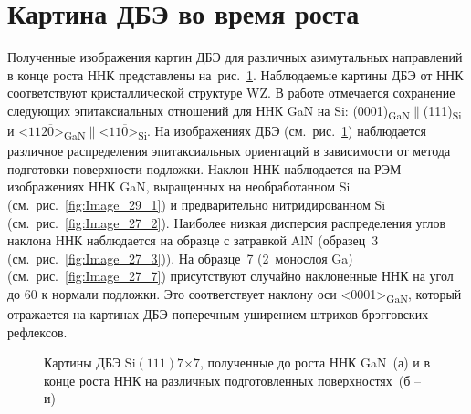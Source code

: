 \section{Картина ДБЭ во время роста}\label{sec:ch4/sec3}

Полученные изображения картин ДБЭ для различных азимутальных направлений в конце роста ННК представлены на~рис.~\cref{fig:Image_29}. Наблюдаемые картины ДБЭ от ННК соответствуют кристаллической структуре WZ. В работе \cite{Wierzbicka2013} отмечается сохранение следующих эпитаксиальных отношений для ННК GaN на Si: (0001)\textsubscript{GaN}\(\parallel\)(111)\textsubscript{Si} и <\(112\overline{0}\)>\textsubscript{GaN}\(\parallel\)<\(11\overline{0}\)>\textsubscript{Si}. На изображениях ДБЭ (см.~рис.~\cref{fig:Image_29}) наблюдается различное распределения эпитаксиальных ориентаций в зависимости от метода подготовки поверхности подложки. Наклон ННК наблюдается на РЭМ изображениях ННК GaN, выращенных на необработанном Si (см.~рис.~\cref{fig:Image_29_1}) и предварительно нитридированном Si (см.~рис.~\cref{fig:Image_27_2}). Наиболее низкая дисперсия распределения углов наклона ННК наблюдается на образце с затравкой AlN (образец~3 (см.~рис.~\cref{fig:Image_27_3})). На образце~7 (2~монослоя Ga) (см.~рис.~\cref{fig:Image_27_7}) присутствуют случайно наклоненные ННК на угол до 60{\textdegree} к нормали подложки. Это соответствует наклону оси <0001>\textsubscript{GaN}, который отражается на картинах ДБЭ поперечным уширением штрихов брэгговских рефлексов.

\begin{figure}[ht]
	\caption{Картины ДБЭ Si\((111)7\)\(\times\)\(7\), полученные до роста ННК GaN~(а) и в конце роста ННК на различных подготовленных поверхностях~(б -- и)}\label{fig:Image_29}
\end{figure}

